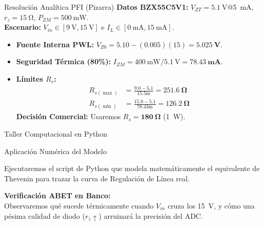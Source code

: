 \documentclass[10pt, aspectratio=169]{beamer}
\begin{document}
\begin{frame}{Resolución Analítica PFI (Pizarra)}
  \textbf{Datos BZX55C5V1:} $V_{ZT}=\qty{5.1}{\volt}$@\qty{5}{\milli\ampere}, $r_z=\qty{15}{\ohm}$, $P_{ZM}=\qty{500}{\milli\watt}$.\\
  \textbf{Escenario:} $V_{in} \in [\qty{9}{\volt}, \qty{15}{\volt}]$ e $I_L \in [\qty{0}{\milli\ampere}, \qty{15}{\milli\ampere}]$.
  
  \vspace{0.2cm}
  \begin{itemize}
      \item \textbf{Fuente Interna PWL:} $V_{Z0} = 5.10 - (0.005)(15) = \mathbf{\qty{5.025}{\volt}}$.
      \item \textbf{Seguridad Térmica (80\%):} $I_{ZM} = \qty{400}{\milli\watt} / \qty{5.1}{\volt} = \mathbf{\qty{78.43}{\milli\ampere}}$.
      \item \textbf{Límites $R_s$:}
      \begin{align*}
          R_{s(\max)} &= \frac{9.0 - 5.1}{15.5\text{m}} = \mathbf{\qty{251.6}{\ohm}} \\
          R_{s(\min)} &= \frac{15.0 - 5.1}{78.43\text{m}} = \mathbf{\qty{126.2}{\ohm}} 
      \end{align*}
      \alert{\textbf{Decisión Comercial:}} Usaremos $R_s = \mathbf{\qty{180}{\ohm}}$ (\qty{1}{\watt}).
  \end{itemize}
\end{frame}

\begin{frame}{Taller Computacional en Python}
  \begin{center}
      Aplicación Numérica del Modelo
  \end{center}
  \vspace{0.2cm}
  Ejecutaremos el script de Python que modela matemáticamente el equivalente de Thevenin para trazar la curva de Regulación de Línea real.
  
  \vspace{0.4cm}
  \textbf{Verificación ABET en Banco:}\\
  Observaremos qué sucede térmicamente cuando $V_{in}$ cruza los \qty{15}{\volt}, y cómo una pésima calidad de diodo ($r_z \uparrow$) arruinará la precisión del ADC.
\end{frame}
\end{document}
